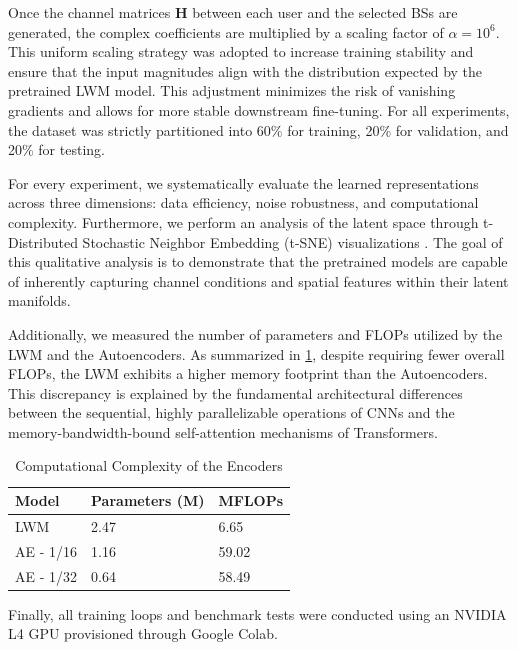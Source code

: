 Once the channel matrices $\mathbf{H}$ between each user and the selected BSs are generated, the complex coefficients are multiplied by a scaling factor of $\alpha = 10^{6}$. This uniform scaling strategy was adopted to increase training stability and ensure that the input magnitudes align with the distribution expected by the pretrained LWM model. This adjustment minimizes the risk of vanishing gradients and allows for more stable downstream fine-tuning. For all experiments, the dataset was strictly partitioned into 60\% for training, 20\% for validation, and 20\% for testing.

For every experiment, we systematically evaluate the learned representations across three dimensions: data efficiency, noise robustness, and computational complexity. Furthermore, we perform an analysis of the latent space through t-Distributed Stochastic Neighbor Embedding (t-SNE) visualizations \cite{vandermaaten2008visualizing}. The goal of this qualitative analysis is to demonstrate that the pretrained models are capable of inherently capturing channel conditions and spatial features within their latent manifolds.

Additionally, we measured the number of parameters and FLOPs utilized by the LWM and the Autoencoders. As summarized in \ref{tab:encoder_complexity}, despite requiring fewer overall FLOPs, the LWM exhibits a higher memory footprint than the Autoencoders. This discrepancy is explained by the fundamental architectural differences between the sequential, highly parallelizable operations of CNNs and the memory-bandwidth-bound self-attention mechanisms of Transformers.

\begin{table}[htbp]
    \centering
    \caption{Computational Complexity of the Encoders}
    \label{tab:encoder_complexity}
    \begin{tabular}{lll}
        \hline
        \textbf{Model} & \textbf{Parameters (M)} & \textbf{MFLOPs} \\
        \hline
        LWM & 2.47 & 6.65 \\
        AE - 1/16 & 1.16 & 59.02 \\
        AE - 1/32 & 0.64 & 58.49 \\
        \hline
    \end{tabular}
\end{table}

Finally, all training loops and benchmark tests were conducted using an NVIDIA L4 GPU provisioned through Google Colab.

